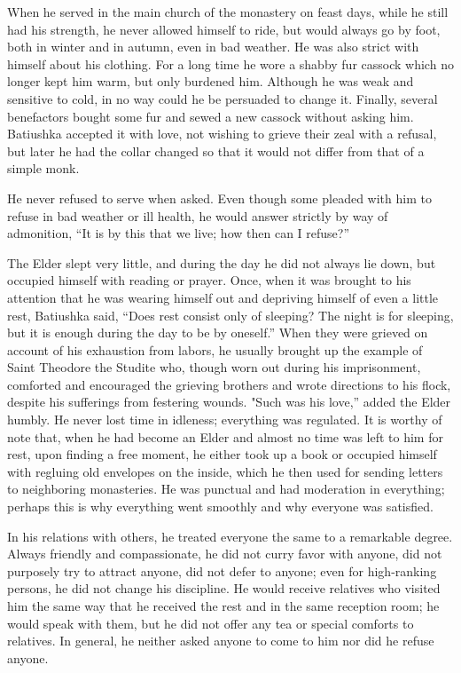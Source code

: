 When he served in the main church of the monastery on feast days, while he still had his strength, he never allowed himself to ride, but would always go by foot, both in winter and in autumn, even in bad weather. He was also strict with himself about his clothing. For a long time he wore a shabby fur cassock which no longer kept him warm, but only burdened him. Although he was weak and sensitive to cold, in no way could he be persuaded to change it. Finally, several benefactors bought some fur and sewed a new cassock without asking him. Batiushka accepted it with love, not wishing to grieve their zeal with a refusal, but later he had the collar changed so that it would not differ from that of a simple monk.

He never refused to serve when asked. Even though some pleaded with him to refuse in bad weather or ill health, he would answer strictly by way of admonition, “It is by this that we live; how then can I refuse?”

The Elder slept very little, and during the day he did not always lie down, but occupied himself with reading or prayer. Once, when it was brought to his attention that he was wearing himself out and depriving himself of even a little rest, Batiushka said, “Does rest consist only of sleeping? The night is for sleeping, but it is enough during the day to be by oneself.” When they were grieved on account of his exhaustion from labors, he usually brought up the example of Saint Theodore the Studite who, though worn out during his imprisonment, comforted and encouraged the grieving brothers and wrote directions to his flock, despite his sufferings from festering wounds. "Such was his love,” added the Elder humbly. He never lost time in idleness; everything was regulated. It is worthy of note that, when he had become an Elder and almost no time was left to him for rest, upon finding a free moment, he either took up a book or occupied himself with regluing old envelopes on the inside, which he then used for sending letters to neighboring monasteries. He was punctual and had moderation in everything; perhaps this is why everything went smoothly and why everyone was satisfied.

In his relations with others, he treated everyone the same to a remarkable degree. Always friendly and compassionate, he did not curry favor with anyone, did not purposely try to attract anyone, did not defer to anyone; even for high-ranking persons, he did not change his discipline. He would receive relatives who visited him the same way that he received the rest and in the same reception room; he would speak with them, but he did not offer any tea or special comforts to relatives. In general, he neither asked anyone to come to him nor did he refuse anyone.

